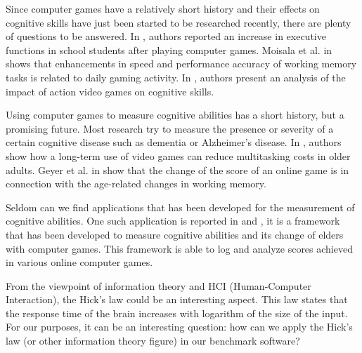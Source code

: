 Since computer games have a relatively short history and their effects on cognitive skills have just been started to be researched recently, there are plenty of questions to be answered. In \cite{HOMER201850}, authors reported an increase in executive functions in school students after playing computer games. Moisala et al. in \cite{MOISALA2017204} shows that enhancements in speed and performance accuracy 
of working memory tasks is related to daily gaming activity. In \cite{bediou2018meta}, authors present an analysis of the impact of action video games on cognitive skills.

Using computer games to measure cognitive abilities has a short history, but a promising future. Most research try to measure the presence or severity of a certain cognitive disease such as dementia or Alzheimer's disease.
In \cite{anguera2013video}, authors show how a long-term use of video games can reduce multitasking costs in older adults. Geyer et al. in \cite{GEYER2015260} show that the change of the score of an online game is in connection with the age-related changes in working memory.

Seldom can we find applications that has been developed for the measurement of cognitive abilities. One such application is reported in \cite{10.1007/978-3-319-27695-3_13} and \cite{pataki2015computer}, it is a framework that has been developed to measure cognitive abilities and its change of elders with computer games. This framework is able to log and analyze scores achieved in various online computer games.

From the viewpoint of information theory and HCI (Human-Computer Interaction), the Hick's law \cite{seow} could be an interesting aspect. This law states that the response time of the brain increases with logarithm of the size of the input. For our purposes, it can be an interesting question: 
how can we apply the Hick's law (or other information theory figure) in our benchmark software?